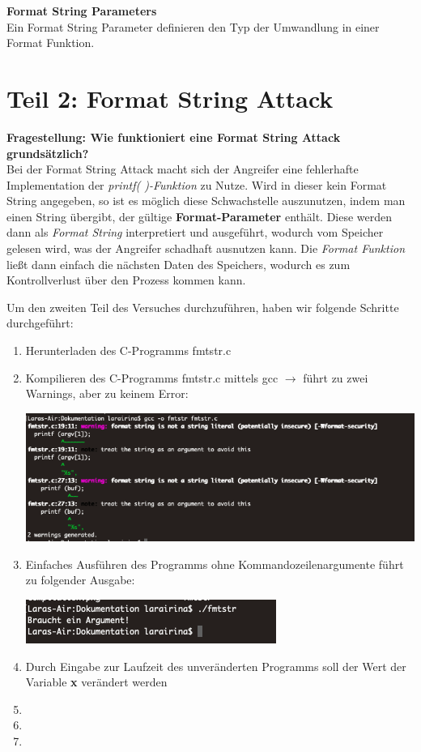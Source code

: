 \documentclass[12pt,a4paper]{article}
\begin{document}
	\textbf{Format String Parameters} \\
	Ein Format String Parameter definieren den Typ der Umwandlung in einer Format Funktion.
	\bigskip

	
	\section*{Teil 2: Format String Attack}
	
	\textbf{Fragestellung: Wie funktioniert eine Format String Attack grundsätzlich?} \\
	Bei der Format String Attack macht sich der Angreifer eine fehlerhafte Implementation der \textit{printf( )-Funktion} zu Nutze. Wird in dieser kein Format String angegeben, so ist es möglich diese Schwachstelle auszunutzen, indem man einen String übergibt, der gültige \textbf{Format-Parameter} enthält. Diese werden dann als \textit{Format String} interpretiert und ausgeführt, wodurch vom Speicher gelesen wird, was der Angreifer schadhaft ausnutzen kann. Die \textit{Format Funktion} ließt dann einfach die nächsten Daten des Speichers, wodurch es zum Kontrollverlust über den Prozess kommen kann.
	\bigskip
	
	Um den zweiten Teil des Versuches durchzuführen, haben wir folgende Schritte durchgeführt:
	
	\begin{enumerate}
		\item Herunterladen des C-Programms fmtstr.c
		\item Kompilieren des C-Programms fmtstr.c mittels gcc $\rightarrow$ führt zu zwei Warnings, aber zu keinem Error:
			\begin{center}
			\includegraphics[scale=0.3]{compilation.png}
			\end{center}
		\item Einfaches Ausführen des Programms ohne Kommandozeilenargumente führt zu folgender Ausgabe:
		\begin{center}
			\includegraphics[scale=0.8]{ohneCmdln.png}
		\end{center}
		\item Durch Eingabe zur Laufzeit des unveränderten Programms soll der Wert der Variable \textbf{x} verändert werden
		\item 
		\item
		\item
	\end{enumerate}
\end{document}

